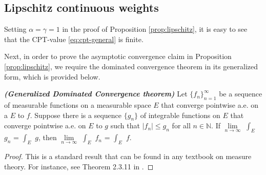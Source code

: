 \subsection{Lipschitz continuous weights}
\label{sec:lipschitz-proofs}
 Setting $\alpha=\gamma=1$ in the proof of Proposition \ref{prop:lipschitz}, it is easy to see that the CPT-value \eqref{eq:cpt-general} is finite. 

Next, in order to prove the asymptotic convergence claim in Proposition \ref{prop:lipschitz}, we require the dominated convergence theorem in its generalized form, which is provided below.
\begin{theorem}{\textbf{\textit{(Generalized Dominated Convergence theorem)}}}
Let $\{f_n\}_{n=1}^\infty$ be a sequence of measurable functions on a measurable space $E$ that converge pointwise a.e. on a  $E$ to $f$.  Suppose there is a sequence $\{g_n\}$ of integrable functions on $E$ that converge pointwise a.e. on $E$ to $g$ such that $|f_n| \leq g_n$ for all $n \in \mathbb{N}$.  
If $\lim\limits_{n \rightarrow \infty}$ $\int_E$ $g_n$ = $\int_E$ $g$, then $\lim\limits_{n \rightarrow \infty}$ $\int_E$ $f_n$ = $\int_E$ $f$.
\end{theorem}


\begin{proof}
This is a standard result that can be found in any textbook on measure theory. For instance, see Theorem 2.3.11 in \cite{athreya2006measure}.
\end{proof}



